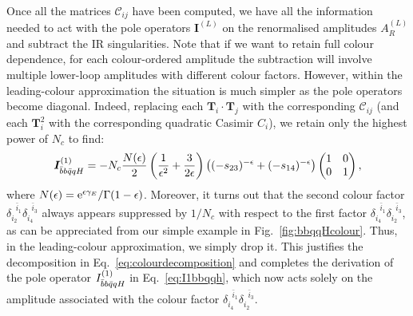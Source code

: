 \documentclass[main.tex]{subfiles}
\begin{document}
Once all the matrices $\mathcal{C}_{ij}$ have been computed, we have all the information needed to act with the pole operators $\bm{I}^{(L)}$ on the renormalised amplitudes $A_R^{(L)}$ and subtract the IR singularities. Note that if we want to retain full colour dependence, for each colour-ordered amplitude the subtraction will involve multiple lower-loop amplitudes with different colour factors. However, within the leading-colour approximation the situation is much simpler as the pole operators become diagonal. Indeed, replacing each $\bm{T}_i \cdot \bm{T}_j$ with the corresponding $\mathcal{C}_{ij}$ (and each $\bm{T}_i^2$ with the corresponding quadratic Casimir $C_i$), we retain only the highest power of $N_c$ to find:
\begin{equation}
    \bm{I}_{\bar{b}b\bar{q}qH}^{(1)} = -N_c \frac{N(\epsilon)}{2}\left(\frac{1}{\epsilon^2} + \frac{3}{2\epsilon} \right) \left((-s_{23})^{-\epsilon} + (-s_{14})^{-\epsilon}\right)
    \begin{pmatrix}
        1 & 0 \\
        0 & 1
    \end{pmatrix},
\end{equation}
where $N(\epsilon) = {\mathrm{e}^{\epsilon \gamma_E}}/{\Gamma(1-\epsilon)}$. Moreover, it turns out that the second colour factor $\delta_{i_2}^{\;\;\bar{i}_1} \delta_{i_4}^{\;\;\bar{i}_3}$ always appears suppressed by $1/N_c$ with respect to the first factor $\delta_{i_4}^{\;\;\bar{i}_1} \delta_{i_2}^{\;\;\bar{i}_3}$, as can be appreciated from our simple example in Fig.~\ref{fig:bbqqHcolour}. Thus, in the leading-colour approximation, we simply drop it. This justifies the decomposition in Eq.~\ref{eq:colourdecomposition} and completes the derivation of the pole operator $I_{\bar{b}b\bar{q}qH}^{(1)}$ in Eq.~\ref{eq:I1bbqqh}, which now acts solely on the amplitude associated with the colour factor $\delta_{i_4}^{\;\;\bar{i}_1} \delta_{i_2}^{\;\;\bar{i}_3}$.
\end{document}
